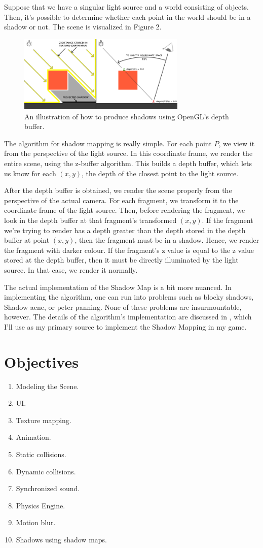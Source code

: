 \documentclass[11pt]{article}
\begin{document}
Suppose that we have a singular light source and a world consisting of objects. Then, it's possible to determine whether each point in the world should be in a shadow or not. The scene is visualized in Figure 2.

\begin{figure}[H]
\includegraphics[width=8cm]{shadow_mapping_theory_spaces}
\centering
\caption{An illustration of how to produce shadows using OpenGL's depth buffer\cite{shadow-map-learn-opengl}.}
\end{figure}

The algorithm for shadow mapping is really simple. For each point $P$, we view it from the perspective of the light source. In this coordinate frame, we render the entire scene, using the z-buffer algorithm. This builds a depth buffer, which lets us know for each $(x, y)$, the depth of the closest point to the light source.

After the depth buffer is obtained, we render the scene properly from the perspective of the actual camera. For each fragment, we transform it to the coordinate frame of the light source. Then, before rendering the fragment, we look in the depth buffer at that fragment's transformed $(x, y)$. If the fragment we're trying to render has a depth greater than the depth stored in the depth buffer at point $(x, y)$, then the fragment must be in a shadow. Hence, we render the fragment with darker colour. If the fragment's z value is equal to the z value stored at the depth buffer, then it must be directly illuminated by the light source. In that case, we render it normally.  

The actual implementation of the Shadow Map is a bit more nuanced. In implementing the algorithm, one can run into problems such as blocky shadows, Shadow acne, or peter panning. None of these problems are insurmountable, however. The details of the algorithm's implementation are discussed in \cite{shadow-map-learn-opengl}, which I'll use as my primary source to implement the Shadow Mapping in my game.

\printbibliography
\section*{Objectives}
\begin{enumerate}
\item Modeling the Scene.
\item UI.
\item Texture mapping.
\item Animation.
\item Static collisions.
\item Dynamic collisions.
\item Synchronized sound.
\item Physics Engine.
\item Motion blur.
\item Shadows using shadow maps.
\end{enumerate}
\end{document}

